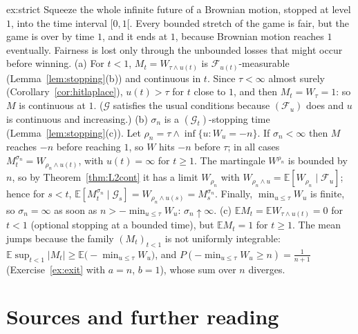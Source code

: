\begin{solution}{ex:strict}
\idea Squeeze the whole infinite future of a Brownian motion, stopped at level $1$, into the time interval $[0,1[$. Every bounded stretch of the game is fair, but the game is over by time $1$, and it ends
at $1$, because Brownian motion reaches $1$ eventually. Fairness is lost only through the unbounded losses that might occur before winning.
\writeup (a) For $t<1$, $M_t=W_{\tau\wedge u(t)}$ is $\mathcal F_{u(t)}$-measurable (Lemma~\ref{lem:stopping}(b)) and continuous in $t$. Since $\tau<\infty$ almost surely (Corollary~\ref{cor:hitlaplace}), $u(t)>\tau$ for $t$ close
to $1$, and then $M_t=W_\tau=1$: so $M$ is continuous at $1$. ($\mathcal G$ satisfies the usual conditions because $(\mathcal F_u)$ does and $u$ is continuous and increasing.)
(b) $\sigma_n$ is a $(\mathcal G_t)$-stopping time (Lemma~\ref{lem:stopping}(c)). Let $\rho_n=\tau\wedge\inf\{u:W_u=-n\}$. If $\sigma_n<\infty$ then $M$ reaches $-n$ before reaching $1$, so $W$ hits $-n$ before $\tau$; in
all cases $M^{\sigma_n}_t=W_{\rho_n\wedge u(t)}$, with $u(t)=\infty$ for $t\ge1$. The martingale $W^{\rho_n}$ is bounded by $n$, so by Theorem~\ref{thm:L2cont} it has a limit $W_{\rho_n}$ with
$W_{\rho_n\wedge u}=\mathbb E[W_{\rho_n}\mid\mathcal F_u]$; hence for $s<t$, $\mathbb E[M^{\sigma_n}_t\mid\mathcal G_s]=W_{\rho_n\wedge u(s)}=M^{\sigma_n}_s$. Finally, $\min_{u\le\tau}W_u$ is finite, so $\sigma_n=\infty$ as soon as
$n>-\min_{u\le\tau}W_u$: $\sigma_n\uparrow\infty$.
(c) $\mathbb EM_t=\mathbb EW_{\tau\wedge u(t)}=0$ for $t<1$ (optional stopping at a bounded time), but $\mathbb EM_t=1$ for $t\ge1$. The mean jumps because the family $(M_t)_{t<1}$ is not uniformly integrable:
$\mathbb E\sup_{t<1}|M_t|\ge\mathbb E\bigl(-\min_{u\le\tau}W_u\bigr)$, and $P(-\min_{u\le\tau}W_u\ge n)=\frac1{n+1}$ (Exercise~\ref{ex:exit} with $a=n$, $b=1$), whose sum over $n$ diverges.
\end{solution}

\section*{Sources and further reading}

